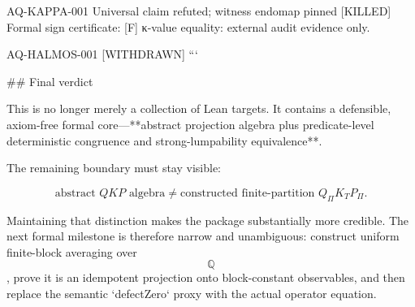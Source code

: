 AQ-KAPPA-001
Universal claim refuted; witness endomap pinned
[KILLED]
Formal sign certificate: [F]
κ-value equality: external audit evidence only.

AQ-HALMOS-001
[WITHDRAWN]
```

## Final verdict

This is no longer merely a collection of Lean targets. It contains a defensible, axiom-free formal core—**abstract projection algebra plus predicate-level deterministic congruence and strong-lumpability equivalence**.

The remaining boundary must stay visible:

$$
\text{abstract }QKP\text{ algebra}
\neq
\text{constructed finite-partition }Q_\Pi K_TP_\Pi.
$$

Maintaining that distinction makes the package substantially more credible. The next formal milestone is therefore narrow and unambiguous: construct uniform finite-block averaging over $$\mathbb Q$$, prove it is an idempotent projection onto block-constant observables, and then replace the semantic `defectZero` proxy with the actual operator equation.

